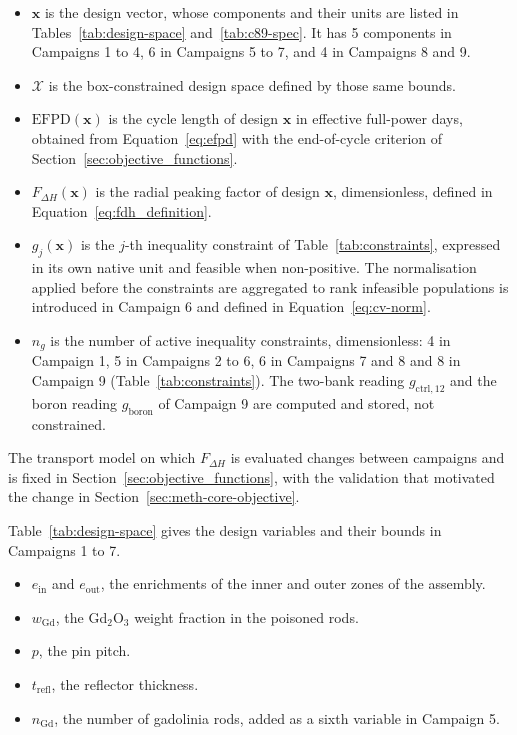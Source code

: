 \begin{itemize}
  \item $\mathbf{x}$ is the design vector, whose components and their
        units are listed in Tables~\ref{tab:design-space}
        and~\ref{tab:c89-spec}. It has 5 components in Campaigns 1 to 4, 6 in Campaigns 5 to 7, and 4 in Campaigns 8 and 9.

  \item $\mathcal{X}$ is the box-constrained design space defined by those
        same bounds.

  \item $\mathrm{EFPD}(\mathbf{x})$ is the cycle length of design
        $\mathbf{x}$ in effective full-power days, obtained from
        Equation~\eqref{eq:efpd} with the end-of-cycle criterion of
        Section~\ref{sec:objective_functions}.

  \item $F_{\Delta H}(\mathbf{x})$ is the radial peaking factor of
        design $\mathbf{x}$, dimensionless, defined in
        Equation~\eqref{eq:fdh_definition}.

  \item $g_j(\mathbf{x})$ is the $j$-th inequality constraint of
        Table~\ref{tab:constraints}, expressed in its own native unit
        and feasible when non-positive. The normalisation applied
        before the constraints are aggregated to rank infeasible
        populations is introduced in Campaign 6 and defined in
        Equation~\eqref{eq:cv-norm}.

  \item $n_g$ is the number of active inequality constraints,
        dimensionless: 4 in Campaign 1, 5 in Campaigns 2 to 6, 6 in Campaigns 7 and 8 and 8 in Campaign 9
        (Table~\ref{tab:constraints}). The two-bank reading
        $g_\mathrm{ctrl,12}$ and the boron reading $g_\mathrm{boron}$ of
        Campaign 9 are computed and stored, not constrained.
\end{itemize}

The transport model on which $F_{\Delta H}$ is evaluated changes between
campaigns and is
fixed in Section~\ref{sec:objective_functions}, with the validation
that motivated the change in Section~\ref{sec:meth-core-objective}.

Table~\ref{tab:design-space} gives the design variables and their bounds in Campaigns 1 to 7.

\begin{itemize}
  \item $e_\mathrm{in}$ and $e_\mathrm{out}$, the enrichments of the
        inner and outer zones of the assembly.

  \item $w_\mathrm{Gd}$, the Gd$_2$O$_3$ weight fraction in the
        poisoned rods.

  \item $p$, the pin pitch.

  \item $t_\mathrm{refl}$, the reflector thickness.

  \item $n_\mathrm{Gd}$, the number of gadolinia rods, added as a sixth
        variable in Campaign 5.
\end{itemize}

